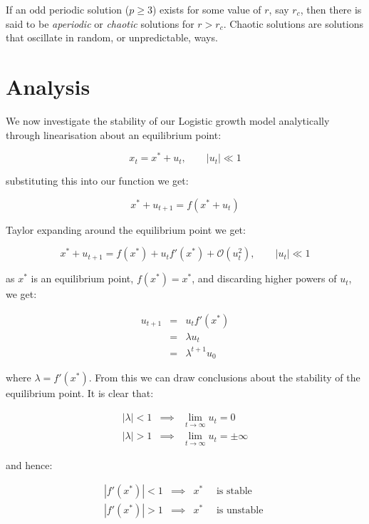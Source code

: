 \documentclass{report}
\begin{document}
If an odd periodic solution ($p \ge 3$) exists for some value of $r$, say $r_c$, then there
is said to be \emph{aperiodic} or \emph{chaotic} solutions for $r > r_c$. Chaotic solutions are
solutions that oscillate in random, or unpredictable, ways.\bigskip




\section{Analysis}

We now investigate the stability of our Logistic growth model analytically through
linearisation about an equilibrium point: \bigskip

\[
    x_t = x^* + u_t, \qquad \left|u_t\right| \ll 1
\]\medskip

substituting this into our function we get: \bigskip

\[
    x^* + u_{t + 1} = f(x^* + u_t)
\]\medskip

Taylor expanding around the equilibrium point we get: \bigskip

\[
    x^* + u_{t + 1} = f(x^*) +  u_t f'(x^*) + \mathcal{O}(u_t^2), \qquad \left|u_t\right| \ll 1
\]\medskip

as $x^*$ is an equilibrium point, $f(x^*) = x^*$, and discarding higher powers of $u_t$,
we get: \bigskip

\begin{eqnarray*}
    u_{t + 1} & = & u_t f'(x^*) \\
              & = & \lambda u_t \\
              & = & \lambda^{t + 1} u_0
\end{eqnarray*}\medskip

where $\lambda = f'(x^*)$. From this we can draw conclusions about the stability of the
equilibrium point. It is clear that: \bigskip

\begin{eqnarray*}
    \left| \lambda \right| < 1 & \implies & \lim_{t \to \infty} u_t = 0 \\
    \left| \lambda \right| > 1 & \implies & \lim_{t \to \infty} u_t = \pm \infty
\end{eqnarray*}\medskip

and hence: \bigskip

\begin{eqnarray*}
	\left| f'(x^*) \right| < 1 & \implies & x^* \quad \text{ is stable } \\
	\left| f'(x^*) \right| > 1 & \implies & x^* \quad \text{ is unstable }
\end{eqnarray*}\medskip
\end{document}
